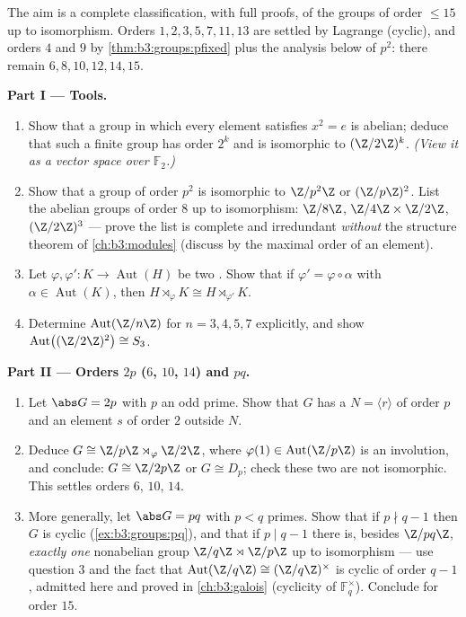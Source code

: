 \begin{problem}\label{pb:b3:groups:1}
The aim is a complete classification, with full proofs, of the
groups of order $\leq 15$ up to isomorphism. Orders $1, 2, 3, 5,
7, 11, 13$ are settled by Lagrange (cyclic), and orders $4$ and
$9$ by \cref{thm:b3:groups:pfixed} plus the analysis below of
$p^2$: there remain $6, 8, 10, 12, 14, 15$.

\medskip
\noindent\textbf{Part I --- Tools.}
\begin{enumerate}
  \item Show that a group in which every element satisfies $x^2 =
        e$ is abelian; deduce that such a finite group has order
        $2^k$ and is isomorphic to $(\Z/2\Z)^k$. \emph{(View it as
        a vector space over $\mathbb F_2$.)}
  \item Show that a group of order $p^2$ is isomorphic to
        $\Z/p^2\Z$ or $(\Z/p\Z)^2$. List the abelian groups of
        order $8$ up to isomorphism: $\Z/8\Z$, $\Z/4\Z \times
        \Z/2\Z$, $(\Z/2\Z)^3$ --- prove the list is complete and
        irredundant \emph{without} the structure theorem of
        \cref{ch:b3:modules} (discuss by the maximal order of an
        element).
  \item Let $\varphi, \varphi' \colon K \to \operatorname{Aut}(H)$
        be two . Show that if $\varphi' = \varphi \circ
        \alpha$ with $\alpha \in \operatorname{Aut}(K)$, then $H
        \rtimes_{\varphi} K \cong H \rtimes_{\varphi'} K$.
  \item Determine $\operatorname{Aut}(\Z/n\Z)$ for $n = 3, 4, 5,
        7$ explicitly, and show $\operatorname{Aut}\bigl((\Z/2\Z)^2
        \bigr) \cong S_3$.
\end{enumerate}

\medskip
\noindent\textbf{Part II --- Orders $2p$ ($6$, $10$, $14$) and
$pq$.}
\begin{enumerate}[resume]
  \item Let $\abs G = 2p$ with $p$ an odd prime. Show that $G$ has
        a  $N = \langle r \rangle$ of order $p$ and
        an element $s$ of order $2$ outside $N$.
  \item Deduce $G \cong \Z/p\Z \rtimes_\varphi \Z/2\Z$, where
        $\varphi(1) \in \operatorname{Aut}(\Z/p\Z)$ is an
        involution, and conclude: $G \cong \Z/2p\Z$ or $G \cong
        D_p$; check these two are not isomorphic. This settles
        orders $6$, $10$, $14$.
  \item More generally, let $\abs G = pq$ with $p < q$ primes.
        Show that if $p \nmid q-1$ then $G$ is cyclic
        (\cref{ex:b3:groups:pq}), and that if $p \mid q - 1$ there
        is, besides $\Z/pq\Z$, \emph{exactly one} nonabelian group
        $\Z/q\Z \rtimes \Z/p\Z$ up to isomorphism --- use question
        3 and the fact that $\operatorname{Aut}(\Z/q\Z) \cong
        (\Z/q\Z)^\times$ is cyclic of order $q - 1$, admitted here
        and proved in \cref{ch:b3:galois} (cyclicity of
        $\mathbb F_q^\times$). Conclude for order $15$.
\end{enumerate}


\end{problem}
